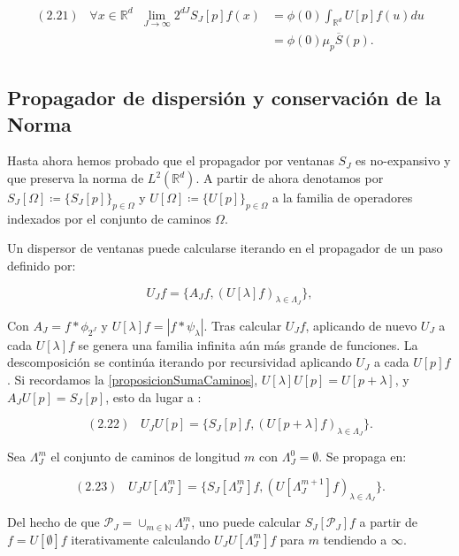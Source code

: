 \begin{align*}
    (2.21) \;\;\; \forall x \in \mathbb{R}^d \;\; \lim_{J \rightarrow \infty} 2^{dJ} S_J[p]f(x) &=\phi(0)\int_{\mathbb{R}^d}U[p]f(u) du \\
    &= \phi(0)\mu_p\overline{S}(p).\\ 
\end{align*}

\subsection{Propagador de dispersión y conservación de la Norma} \label{ch:seccion13}

\noindent Hasta ahora hemos probado que el propagador por ventanas $S_J$ es no-expansivo y que preserva la norma de $L^2(\mathbb{R}^d)$. A partir de ahora denotamos por $S_J[\Omega] \coloneqq \lbrace S_J[p] \rbrace_{p\in\Omega}$ y $U[\Omega]\coloneqq \lbrace U[p] \rbrace_{p\in\Omega}$ a la familia de operadores indexados por el conjunto de caminos $\Omega$.

\medskip

\noindent Un dispersor de ventanas puede calcularse iterando en el propagador de un paso definido por: 

$$U_Jf=\lbrace A_Jf, (U[\lambda]f)_{\lambda\in\Lambda_J} \rbrace,$$

Con $A_J=f\ast \phi_{2^J}$ y $U[\lambda]f=\left| f\ast \psi_\lambda \right|$. Tras calcular $U_Jf$, aplicando de nuevo $U_J$ a cada $U[\lambda]f$ se genera una familia infinita aún más grande de funciones. La descomposición se continúa iterando  por recursividad aplicando $U_J$ a cada $U[p]f$. Si recordamos la \autoref{proposicionSumaCaminos}, $U[\lambda]U[p]=U[p+\lambda]$, y $A_JU[p]=S_J[p]$, esto da lugar a : 

$$(2.22) \;\;\; U_JU[p]=\lbrace S_J[p]f,(U[p+\lambda]f)_{\lambda\in\Lambda_J}\rbrace.$$

\medskip

\noindent Sea $\Lambda_J^m$ el conjunto de caminos de longitud $m$ con $\Lambda_J^0={\emptyset}$. Se propaga en: 

$$(2.23) \;\;\; U_J U[\Lambda_J^m]=\lbrace S_J[\Lambda_J^m]f,(U[\Lambda_J^{m+1}]f)_{\lambda\in\Lambda_J}\rbrace.$$

\noindent Del hecho de que $\mathcal{P}_J=\cup_{m\in \mathbb{N}}\Lambda_J^m$, uno puede calcular $S_J[\mathcal{P}_J]f$ a partir de $f=U[\emptyset]f$ iterativamente calculando $U_J U[\Lambda_J^m]f$ para $m$ tendiendo a $\infty$. 

